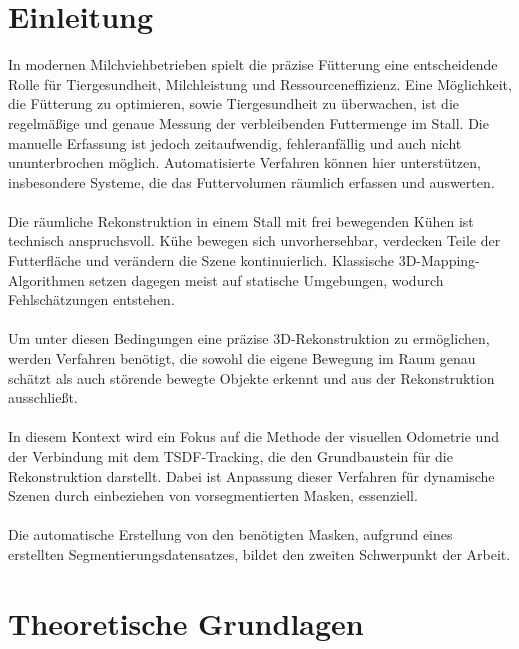 \documentclass[12pt,DIV=15,BCOR=15mm,twoside,headsepline,abstract=true,listof=totoc,bibliography=totoc]{scrreprt}
\theoremstyle{remark}    %
\begin{document}
    \chapter{Einleitung}
    In modernen Milchviehbetrieben spielt die präzise Fütterung eine entscheidende Rolle für Tiergesundheit, Milchleistung und Ressourceneffizienz. Eine Möglichkeit, 
    die Fütterung zu optimieren, sowie Tiergesundheit zu überwachen, ist die regelmäßige und genaue Messung der verbleibenden Futtermenge im Stall.
    Die manuelle Erfassung ist jedoch zeitaufwendig, fehleranfällig und auch nicht ununterbrochen möglich. Automatisierte Verfahren können hier unterstützen, insbesondere 
    Systeme, die das Futtervolumen räumlich erfassen und auswerten.\\\\
    Die räumliche Rekonstruktion in einem Stall mit frei bewegenden Kühen ist technisch anspruchsvoll. Kühe bewegen sich unvorhersehbar, verdecken Teile der Futterfläche 
    und verändern die Szene kontinuierlich. Klassische 3D-Mapping-Algorithmen setzen dagegen meist auf statische Umgebungen, wodurch Fehlschätzungen entstehen.\\\\
    Um unter diesen Bedingungen eine präzise 3D-Rekonstruktion zu ermöglichen, werden Verfahren benötigt, die sowohl die eigene Bewegung im Raum genau schätzt als 
    auch störende bewegte Objekte erkennt und aus der Rekonstruktion ausschließt.\\\\
    In diesem Kontext wird ein Fokus auf die Methode der visuellen Odometrie und der Verbindung mit dem \ac{TSDF}-Tracking, die den Grundbaustein für die Rekonstruktion
    darstellt. Dabei ist Anpassung dieser Verfahren für dynamische Szenen durch einbeziehen von vorsegmentierten Masken, essenziell.\\\\
    Die automatische Erstellung von den benötigten Masken, aufgrund eines erstellten Segmentierungsdatensatzes, bildet den zweiten Schwerpunkt der Arbeit.

    \chapter{Theoretische Grundlagen}
    \label{kap:theo}
\end{document}
